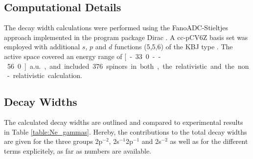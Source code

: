 \subsection{Computational Details}
The decay width calculations were performed using the FanoADC-Stieltjes approach
implemented in the program package Dirac \cite{DIRAC13}.
A cc-pCV6Z basis set was employed with
additional $s$, $p$ and $d$ functions (5,5,6) of the \ac{KBJ} type \cite{Kaufmann89}.
The active space covered an energy range of \unit[-33.0 -- 56.0]{a.u.}, and included
376 spinors in both, the relativistic and the non-relativistic calculation.

\subsection{Decay Widths}
The calculated decay widths are outlined and compared to experimental
results in Table \ref{table:Ne_gammas}. Hereby, the contributions to the
total decay widths are given
for the three groups 2p$^{-2}$, 2s$^{-1}$2p$^{-1}$ and 2s$^{-2}$ as well
as for the different terms explicitely, as far as numbers are available.

